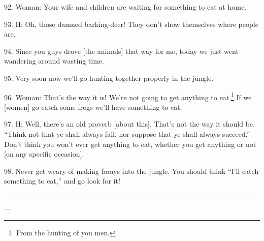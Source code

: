 92. Woman: Your wife and children are waiting for something to eat at home.

93. H: Oh, those damned barking-deer! They don't show themselves where people are.

94. Since you guys drove [the animals] that way for me, today we just went wandering
around wasting time.

95. Very soon now we'll go hunting together properly in the jungle.

96. Woman: That's the way it is! We're not going to get anything to eat.\footnote{From the hunting of you men.} If
we [women] go catch some frogs we'll have something to eat.

97. H: Well, there's an old proverb [about this]. That's not the way it should
be. ``Think not that ye shall always fail, nor suppose that ye shall always succeed.''
Don't think you won't ever get anything to eat, whether you get anything or not
[on any specific occasion].

98. Never get weary of making forays into the jungle. You should think ``I'll catch
something to eat,'' and go look for it!

---------------------------------------------------------------------------------------------------------------

